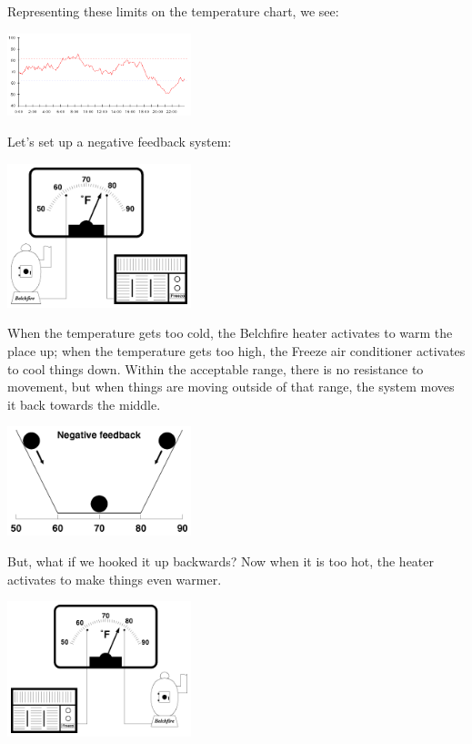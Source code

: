 Representing these limits on the temperature chart, we see:

\begin{center}
	\includegraphics[width=0.4\textwidth]{images/temperature-chart-hotcold.png}
\end{center}

Let's set up a negative feedback system:
\begin{center}
	\includegraphics[width=0.4\textwidth]{images/negativefeedbacksystem.png}
\end{center}

When the temperature gets too cold, the Belchfire heater activates to warm the place up; when the temperature gets too high, the Freeze air conditioner activates to cool things down. Within the acceptable range, there is no resistance to movement, but when things are moving outside of that range, the system moves it back towards the middle.

\begin{center}
	\includegraphics[width=0.4\textwidth]{images/negativefeedback.png}
\end{center}

But, what if we hooked it up backwards? Now when it is too hot, the heater activates to make things even warmer.

\begin{center}
	\includegraphics[width=0.4\textwidth]{images/backwardssystem.png}
\end{center}

